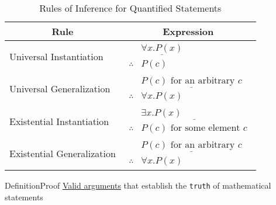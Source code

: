 \documentclass{MathNotes}
\newenvironment{definition}[1]{\begin{RedBox}{Definition}{#1}}{\end{RedBox}}
\begin{document}
\begin{table}[h!]\label{tab:inference-rules-quantified}
	\centering
	\caption{Rules of Inference for Quantified Statements}
	\begin{tabular}{ll}
		\multicolumn{1}{c}{\textbf{Rule}} &
		\multicolumn{1}{c}{\textbf{Expression}}                         \\
		\midrule
		Universal Instantiation           &
		$\begin{array}{rl}
				            & \underline{\forall x.P(x)} \\
				 \therefore & P(c)\end{array}$                        \\
		\hdashline{}
		Universal Generalization          &
		$\begin{array}{rl}
				            & \underline{P(c) \text{ for an arbitrary } c} \\
				 \therefore & \forall x.P(x)\end{array}$        \\
		\hdashline{}
		Existential Instantiation         &
		$\begin{array}{rl}
				            & \underline{\exists x.P(x)\hspace{7em}} \\
				 \therefore & P(c)\text{ for some element } c\end{array}$ \\
		\hdashline{}
		Existential Generalization        &
		$\begin{array}{rl}
				            & \underline{P(c) \text{ for an arbitrary } c} \\
				 \therefore & \forall x.P(x)\end{array}$        \\
	\end{tabular}
\end{table}

\begin{definition}{Proof}\label{def:proof}
	\underline{Valid arguments} that establish the \texttt{truth} of mathematical statements
\end{definition}
\end{document}
